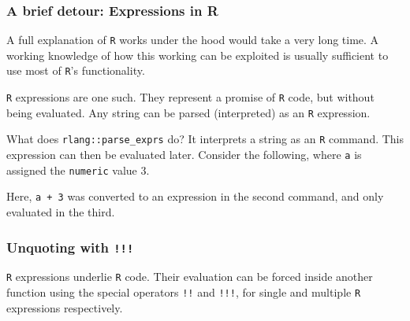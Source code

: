 \documentclass[]{book}
\newenvironment{Shaded}{}{}
\newcommand{\CommentTok}[1]{\textcolor[rgb]{0.38,0.63,0.69}{\textit{#1}}}
\newcommand{\DecValTok}[1]{\textcolor[rgb]{0.25,0.63,0.44}{#1}}
\newcommand{\KeywordTok}[1]{\textcolor[rgb]{0.00,0.44,0.13}{\textbf{#1}}}
\newcommand{\NormalTok}[1]{#1}
\newcommand{\OperatorTok}[1]{\textcolor[rgb]{0.40,0.40,0.40}{#1}}
\newcommand{\StringTok}[1]{\textcolor[rgb]{0.25,0.44,0.63}{#1}}
\begin{document}
\hypertarget{a-brief-detour-expressions-in-r}{%
\subsubsection*{A brief detour: Expressions in R}\label{a-brief-detour-expressions-in-r}}

A full explanation of \texttt{R} works under the hood would take a very long time. A working knowledge of how this working can be exploited is usually sufficient to use most of \texttt{R}'s functionality.

\texttt{R} expressions are one such. They represent a promise of \texttt{R} code, but without being evaluated. Any string can be parsed (interpreted) as an \texttt{R} expression.

What does \texttt{rlang::parse\_exprs} do? It interprets a string as an \texttt{R} command.
This expression can then be evaluated later. Consider the following, where \texttt{a} is assigned the \texttt{numeric} value 3.

\begin{Shaded}
\end{Shaded}

Here, \texttt{a\ +\ 3} was converted to an expression in the second command, and only evaluated in the third.

\hypertarget{unquoting-with}{%
\subsubsection*{\texorpdfstring{Unquoting with \texttt{!!!}}{Unquoting with !!!}}\label{unquoting-with}}

\texttt{R} expressions underlie \texttt{R} code. Their evaluation can be forced inside another function using the special operators \texttt{!!} and \texttt{!!!}, for single and multiple \texttt{R} expressions respectively.
\end{document}
